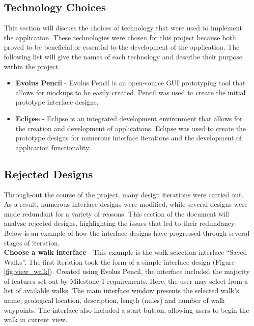 \documentclass[11pt,a4paper]{report}
\begin{document}
\subsection{Technology Choices}
This section will discuss the choices of technology that were used to implement the application. These technologies were chosen for this project because both proved to be beneficial or essential to the development of the application. The following list will give the names of each technology and describe their purpose within the project.

\begin{itemize}

\item \textbf{Evolus Pencil} - Evolus Pencil is an open-source GUI prototyping tool that allows for mockups to be easily created. Pencil was used to create the initial prototype interface designs.

\item \textbf{Eclipse} - Eclipse is an integrated development environment that allows for the creation and development of applications. Eclipse was used to create the prototype designs for numerous interface iterations and the development of application functionality.

\end{itemize}

\subsection{Rejected Designs}
\label{sec:rejected-designs}

Through-out the course of the project, many design iterations were carried out. As a result, numerous interface designs were modified, while several designs were made redundant for a variety of reasons. This section of the document will analyse rejected designs, highlighting the issues that led to their redundancy. Below is an example of how the interface designs have progressed through several stages of iteration.\\

\textbf{Choose a walk interface} - This example is the walk selection interface ``Saved Walks''. The first iteration took the form of a simple interface design (Figure \ref{fig:view_walk}). Created using Evolus Pencil, the interface included the majority of features set out by Milestone 1 requirements. Here, the user may select from a list of available walks. The main interface window presents the selected walk's name, geological location, description, length (miles) and number of walk waypoints. The interface also included a start button, allowing users to begin the walk in current view.
\end{document}
